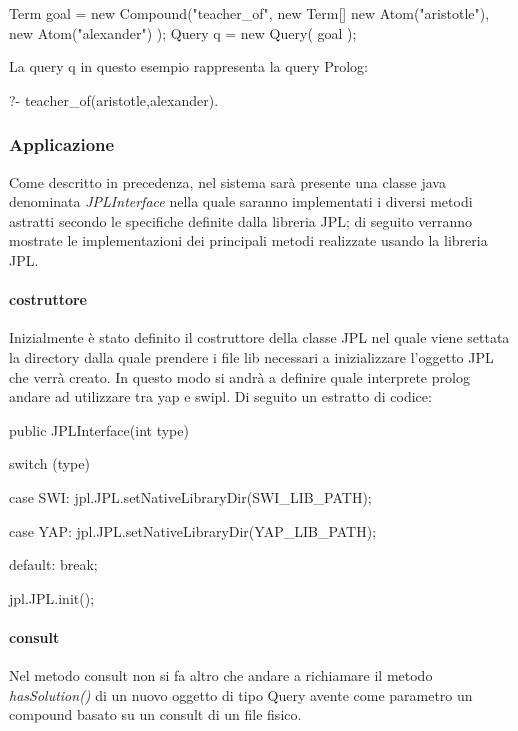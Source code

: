 \begin{javacode}
	Term goal = new Compound("teacher_of",
	  new Term[] {
		  new Atom("aristotle"),
		  new Atom("alexander")
		  }
	  );
	Query q = new Query( goal );
\end{javacode}

La query q in questo esempio rappresenta la query Prolog:

\begin{prologcode}
	?- teacher_of(aristotle,alexander).
\end{prologcode}

\subsubsection{Applicazione}
Come descritto in precedenza, nel sistema sarà presente una classe java denominata \emph{JPLInterface} nella quale saranno implementati i diversi metodi astratti secondo le specifiche definite dalla libreria JPL; di seguito verranno mostrate le implementazioni dei principali metodi realizzate usando la libreria JPL.
\paragraph{costruttore}
Inizialmente è stato definito il costruttore della classe JPL nel quale viene settata la directory dalla quale prendere i file lib necessari a inizializzare l'oggetto JPL che verrà creato. In questo modo si andrà a definire quale interprete prolog andare ad utilizzare tra yap e swipl. Di seguito un estratto di codice:

\begin{javacode}
  public JPLInterface(int type) {
  
    switch (type) {
  
      case SWI:
      jpl.JPL.setNativeLibraryDir(SWI_LIB_PATH);
      
      case YAP:
      jpl.JPL.setNativeLibraryDir(YAP_LIB_PATH);
      
      default:
      break;
    }
    jpl.JPL.init();
  }
\end{javacode}

\paragraph{consult}
Nel metodo consult non si fa altro che andare a richiamare il metodo \emph{hasSolution()} di un nuovo oggetto di tipo Query avente come parametro un compound basato su un consult di un file fisico.

